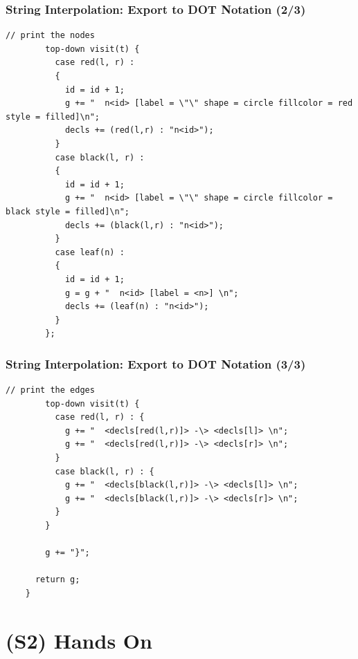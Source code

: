 \documentclass{beamer}
\begin{document}
\begin{frame}[fragile]
  \frametitle{String Interpolation: Export to DOT Notation (2/3)}

  \begin{small}
    \begin{lstlisting}[language=Rascal]
        // print the nodes
        top-down visit(t) {
          case red(l, r) :
          {
            id = id + 1;
            g += "  n<id> [label = \"\" shape = circle fillcolor = red style = filled]\n";
            decls += (red(l,r) : "n<id>");
          }
          case black(l, r) :
          {
            id = id + 1;
            g += "  n<id> [label = \"\" shape = circle fillcolor = black style = filled]\n";
            decls += (black(l,r) : "n<id>");
          }
          case leaf(n) :
          {
            id = id + 1;
            g = g + "  n<id> [label = <n>] \n";
            decls += (leaf(n) : "n<id>");
          }
        };
\end{lstlisting}
  \end{small}
\end{frame}

\begin{frame}[fragile]
  \frametitle{String Interpolation: Export to DOT Notation (3/3)}
  \begin{small}
    \begin{lstlisting}[language=Rascal]
        // print the edges
        top-down visit(t) {
          case red(l, r) : {
            g += "  <decls[red(l,r)]> -\> <decls[l]> \n";
            g += "  <decls[red(l,r)]> -\> <decls[r]> \n";
          }
          case black(l, r) : {
            g += "  <decls[black(l,r)]> -\> <decls[l]> \n";
            g += "  <decls[black(l,r)]> -\> <decls[r]> \n";
          }
        }

        g += "}";

      return g;
    }
  \end{lstlisting}  
  \end{small}  
\end{frame}

\section{(S2) Hands On}
\end{document}
